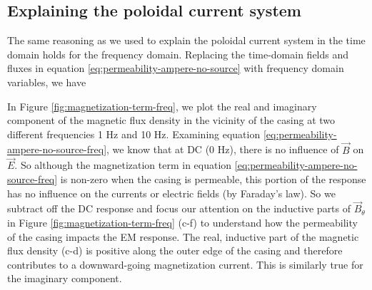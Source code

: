 




\subsection{Explaining the poloidal current system}
The same reasoning as we used to explain the poloidal current system in the time domain holds for the frequency domain. Replacing the time-domain fields and fluxes in equation \ref{eq:permeability-ampere-no-source} with frequency domain variables, we have


In Figure \ref{fig:magnetization-term-freq}, we plot the real and imaginary component of the magnetic flux density in the vicinity of the casing at two different frequencies 1 Hz and 10 Hz. Examining equation \ref{eq:permeability-ampere-no-source-freq}, we know that at DC (0 Hz), there is no influence of $\vec{B}$ on $\vec{E}$. So although the magnetization term in equation \ref{eq:permeability-ampere-no-source-freq} is non-zero when the casing is permeable, this portion of the response has no influence on the currents or electric fields (by Faraday's law). So we subtract off the DC response and focus our attention on the inductive parts of $\vec{B}_\theta$ in Figure \ref{fig:magnetization-term-freq} (c-f) to understand how the permeability of the casing impacts the EM response. The real, inductive part of the magnetic flux density (c-d) is positive along the outer edge of the casing and therefore contributes to a downward-going magnetization current. This is similarly true for the imaginary component.




